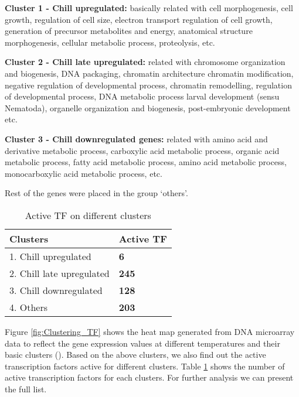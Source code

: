 \textbf{Cluster 1 - Chill upregulated:} basically related with cell morphogenesis, cell growth, regulation of cell size, electron transport regulation of cell growth, generation of precursor metabolites and energy, anatomical structure morphogenesis, cellular metabolic process, proteolysis, etc.

\textbf{Cluster 2 - Chill late upregulated:} related with chromosome organization and biogenesis, DNA packaging, chromatin architecture chromatin modification, negative regulation of developmental process, chromatin remodelling, regulation of developmental process, DNA metabolic process larval development (sensu Nematoda), organelle organization and biogenesis, post-embryonic development etc.

\textbf{Cluster 3 - Chill downregulated genes:} related with amino acid and derivative metabolic process, carboxylic acid metabolic process, organic acid metabolic process, fatty acid metabolic process, amino acid metabolic process, monocarboxylic acid metabolic process, etc.  

Rest of the genes were placed in the group \lq others\rq. 

\begin{table}[!htbp]
	\centering
  \begin{tabular}{l l }
    \toprule
    \textbf{Clusters} & \textbf{Active TF} \\
    \midrule
    1. Chill upregulated & \bf 6 \\ 
    2. Chill late upregulated & \bf245 \\ 
    3. Chill downregulated & \bf128 \\
    4. Others & \bf 203 \\
  \bottomrule
  \end{tabular}
  \caption[Active TF on different clusters]
	  {Active TF on different clusters}
  \label{table:Active_TF_diff_clusters}
\end{table}

Figure \ref{fig:Clustering_TF} shows the heat map generated from DNA microarray data to reflect the gene expression values at different temperatures and their basic clusters (\cite{Cossins:2007}). Based on the above clusters, we also find out the active transcription factors active for different clusters. Table \ref{table:Active_TF_diff_clusters} shows the number of active transcription factors for each clusters. For further analysis we can present the full list.



